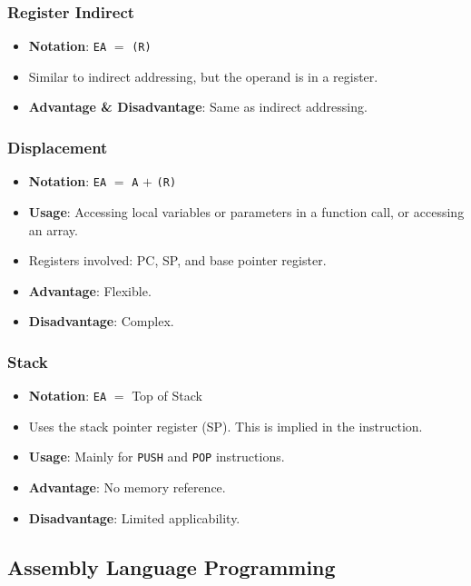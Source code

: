 \begin{multicols}{3}
\columnbreak

\subsubsection{Register Indirect}

\begin{itemize}
    \item \textbf{Notation}: \texttt{EA} $=$ \texttt{(R)}
    \item Similar to indirect addressing, but the operand is in a register.
    \item \textbf{Advantage \& Disadvantage}: Same as indirect addressing.
\end{itemize}

\subsubsection{Displacement}

\begin{itemize}
    \item \textbf{Notation}: \texttt{EA} $=$ \texttt{A} $+$ \texttt{(R)}
    \item \textbf{Usage}: Accessing local variables or parameters in a function call,
        or accessing an array.
    \item Registers involved: PC, SP, and base pointer register.
    \item \textbf{Advantage}: Flexible.
    \item \textbf{Disadvantage}: Complex.
\end{itemize}

\end{multicols}

\subsubsection{Stack}

\begin{itemize}
    \item \textbf{Notation}: \texttt{EA} $=$ Top of Stack
    \item Uses the stack pointer register (SP). This is implied in the instruction.
    \item \textbf{Usage}: Mainly for \texttt{PUSH} and \texttt{POP} instructions.
    \item \textbf{Advantage}: No memory reference.
    \item \textbf{Disadvantage}: Limited applicability.
\end{itemize}

\subsection{Assembly Language Programming}